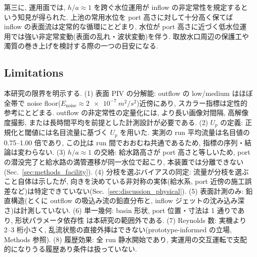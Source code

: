 第三に, 運用面では, $h/a \approx 1$ を跨ぐ水位運用が inflow の非定常性を規定するという知見が得られた. 上池の常用水位を port 高さに対して十分高く保てば inflow の表面流は定常的な循環にとどまり, 水位が port 高さに近づく低水位運用では強い非定常変動(表面の乱れ・波状変動)を伴う. 取放水口周辺の保護工や濁質の巻き上げを検討する際の一つの目安になる.

\subsection{Limitations}
\label{sec:discussion_limitations}

本研究の限界を明示する. (1) 表面 PIV の分解能: outflow の low/medium はほぼ全帯で noise floor($E_{\mathrm{noise}} \approx \SI{2e-7}{m^2/s^2}$)近傍にあり, スカラー指標は定性的参考にとどまる. outflow の非定常性の定量化には, より長い画像対間隔, 高解像度撮影, または長時間平均を前提とした計測設計が必要である. (2) $U_p$ の定義: 正規化と閾値には名目流量に基づく $U_p$ を用いた. 実測の run 平均流量は名目値の 0.75--1.00 倍であり, この比は run 間でおおむね共通であるため, 指標の序列・結論は変わらない. (3) $h/a \approx 1$ の交絡: 給水路高さが port 高さと等しいため, port の潜没完了と給水路の満管遷移が同一水位で起こり, 本装置では分離できない(Sec.~\ref{sec:methods_facility}). (4) 分枝を選ぶバイアスの同定: 流量が分枝を選ぶこと自体は示したが, 向きを決めている非対称の実体(給水系, port 近傍の施工誤差など)は特定できていない(Sec.~\ref{sec:discussion_physical}). (5) 表面計測のみ: 鉛直構造(とくに outflow の吸込み流の鉛直分布と, inflow ジェットの沈み込み深さ)は計測していない. (6) 単一幾何: basin 形状, port 位置・寸法は 1 通りであり, 形状パラメータ依存性 \cite{dufresneClassificationFlowPatterns2010,ferraraFlowFieldShallow2018} は本研究の範囲外である. (7) Reynolds 数: 実機より 2--3 桁小さく, 乱流状態の直接外挿はできない(prototype-informed の立場, Methods 参照). (8) 履歴効果: 全 run 静水開始であり, 実運用の交互運転で支配的になりうる履歴あり条件は扱っていない.

